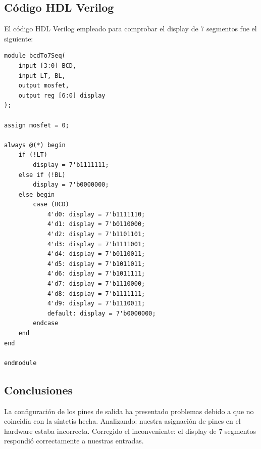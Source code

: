 \subsection{Código HDL Verilog}
\sangria{} El código HDL Verilog empleado para comprobar el display de 7 segmentos fue el siguiente:

\begin{minipage}{16cm}
\begin{lstlisting}
module bcdTo7Seq(
    input [3:0] BCD,
    input LT, BL,
    output mosfet,
    output reg [6:0] display
);

assign mosfet = 0;

always @(*) begin
    if (!LT)
        display = 7'b1111111;
    else if (!BL)
        display = 7'b0000000;
    else begin
        case (BCD)
            4'd0: display = 7'b1111110;
            4'd1: display = 7'b0110000;
            4'd2: display = 7'b1101101;
            4'd3: display = 7'b1111001;
            4'd4: display = 7'b0110011;
            4'd5: display = 7'b1011011;
            4'd6: display = 7'b1011111;
            4'd7: display = 7'b1110000;
            4'd8: display = 7'b1111111;
            4'd9: display = 7'b1110011;
            default: display = 7'b0000000;
        endcase
    end
end

endmodule
\end{lstlisting}\end{minipage}
\subsection{Conclusiones}
\sangria{} La configuración de los pines de salida ha presentado problemas debido a que no coincidía con la síntetis hecha. Analizando: nuestra asignación de pines en el hardware estaba incorrecta. Corregido el inconveniente: el display de 7 segmentos respondió correctamente a nuestras entradas.
